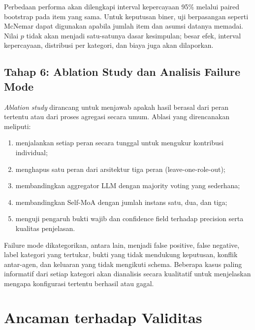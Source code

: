 Perbedaan performa akan dilengkapi interval kepercayaan 95\% melalui paired bootstrap pada item yang sama. Untuk keputusan biner, uji berpasangan seperti McNemar dapat digunakan apabila jumlah item dan asumsi datanya memadai. Nilai $p$ tidak akan menjadi satu-satunya dasar kesimpulan; besar efek, interval kepercayaan, distribusi per kategori, dan biaya juga akan dilaporkan.

\subsection{Tahap 6: Ablation Study dan Analisis Failure Mode}

\textit{Ablation study} dirancang untuk menjawab apakah hasil berasal dari peran tertentu atau dari proses agregasi secara umum. Ablasi yang direncanakan meliputi:
\begin{enumerate}
\item menjalankan setiap peran secara tunggal untuk mengukur kontribusi individual;
\item menghapus satu peran dari arsitektur tiga peran (leave-one-role-out);
\item membandingkan aggregator LLM dengan majority voting yang sederhana;
\item membandingkan Self-MoA dengan jumlah instans satu, dua, dan tiga;
\item menguji pengaruh bukti wajib dan confidence field terhadap precision serta kualitas penjelasan.
\end{enumerate}

Failure mode dikategorikan, antara lain, menjadi false positive, false negative, label kategori yang tertukar, bukti yang tidak mendukung keputusan, konflik antar-agen, dan keluaran yang tidak mengikuti schema. Beberapa kasus paling informatif dari setiap kategori akan dianalisis secara kualitatif untuk menjelaskan mengapa konfigurasi tertentu berhasil atau gagal.

\section{Ancaman terhadap Validitas}

